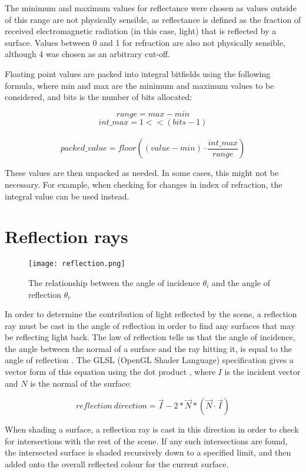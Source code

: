 The minimum and maximum values for reflectance were chosen as values outside of this range are not physically sensible, as reflectance is defined as the fraction of received electromagnetic radiation (in this case, light) that is reflected by a surface. Values between 0 and 1 for refraction are also not physically sensible, although 4 was chosen as an arbitrary cut-off.

Floating point values are packed into integral bitfields using the following formula, where min and max are the minimum and maximum values to be considered, and bits is the number of bits allocated:

\[	range = max - min \]
\[	int\_max = 1 << (bits - 1) \]
\\
\[	packed\_value = floor((value - min) \cdot \frac{int\_max}{range}) \]

These values are then unpacked as needed. In some cases, this might not be necessary. For example, when checking for changes in index of refraction, the integral value can be used instead.

\section{Reflection rays}
\begin{figure}
\centering
	\texttt{[image: reflection.png]}
	\caption{The relationship between the angle of incidence $\theta_i$ and the angle of reflection $\theta_r$}
	\label{fig:reflection}
\end{figure}

In order to determine the contribution of light reflected by the scene, a reflection ray must be cast in the angle of reflection in order to find any surfaces that may be reflecting light back. The law of reflection tells us that the angle of incidence, the angle between the normal of a surface and the ray hitting it, is equal to the angle of reflection \parencite{heath99history}. The GLSL (OpenGL Shader Language) specification gives a vector form of this equation using the dot product \parencite{glslspec}, where $I$ is the incident vector and $N$ is the normal of the surface:

\[
	reflection~direction = \vec{I} - 2 * \vec{N} * (\vec{N} \cdot \vec{I})
\]

When shading a surface, a reflection ray is cast in this direction in order to check for intersections with the rest of the scene. If any such intersections are found, the intersected surface is shaded recursively down to a specified limit, and then added onto the overall reflected colour for the current surface.

